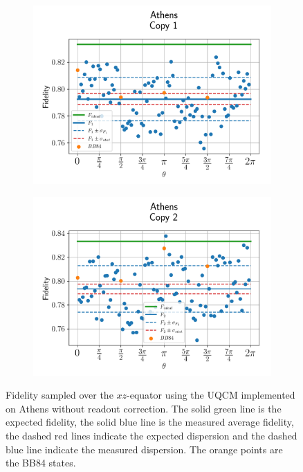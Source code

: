 \begin{figure}[H]
    \centering
    \begin{subfigure}{.45\textwidth}
      \centering
      \includegraphics[width=\textwidth]{Figures/UQCM/IBM/OnlyEquator/results_athens_copy1.png}
    \end{subfigure}%
    \begin{subfigure}{.45\textwidth}
      \centering
      \includegraphics[width=\textwidth]{Figures/UQCM/IBM/OnlyEquator/results_athens_copy2.png}
    \end{subfigure}
    \caption{Fidelity sampled over the $xz$-equator using the UQCM implemented on Athens without readout correction. The solid green line is the expected fidelity, the solid blue line is the measured average fidelity, the dashed red lines indicate the expected dispersion and the dashed blue line indicate the measured dispersion. The orange points are the BB84 states.}
    \la
\end{figure}


